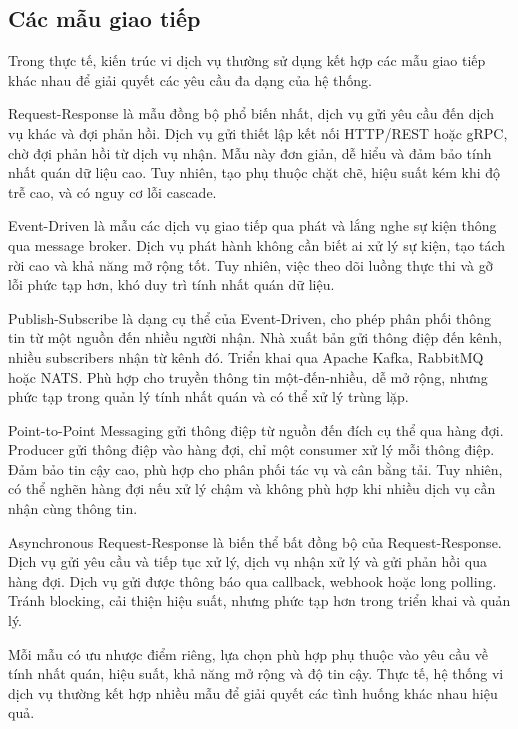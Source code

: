 \subsection{Các mẫu giao tiếp}
Trong thực tế, kiến trúc vi dịch vụ thường sử dụng kết hợp các mẫu giao tiếp khác nhau để giải quyết các yêu cầu đa dạng của hệ thống.

Request-Response là mẫu đồng bộ phổ biến nhất, dịch vụ gửi yêu cầu đến dịch vụ khác và đợi phản hồi. Dịch vụ gửi thiết lập kết nối HTTP/REST hoặc gRPC, chờ đợi phản hồi từ dịch vụ nhận. Mẫu này đơn giản, dễ hiểu và đảm bảo tính nhất quán dữ liệu cao. Tuy nhiên, tạo phụ thuộc chặt chẽ, hiệu suất kém khi độ trễ cao, và có nguy cơ lỗi cascade.

Event-Driven là mẫu các dịch vụ giao tiếp qua phát và lắng nghe sự kiện thông qua message broker. Dịch vụ phát hành không cần biết ai xử lý sự kiện, tạo tách rời cao và khả năng mở rộng tốt. Tuy nhiên, việc theo dõi luồng thực thi và gỡ lỗi phức tạp hơn, khó duy trì tính nhất quán dữ liệu.

Publish-Subscribe là dạng cụ thể của Event-Driven, cho phép phân phối thông tin từ một nguồn đến nhiều người nhận. Nhà xuất bản gửi thông điệp đến kênh, nhiều subscribers nhận từ kênh đó. Triển khai qua Apache Kafka, RabbitMQ hoặc NATS. Phù hợp cho truyền thông tin một-đến-nhiều, dễ mở rộng, nhưng phức tạp trong quản lý tính nhất quán và có thể xử lý trùng lặp.

Point-to-Point Messaging gửi thông điệp từ nguồn đến đích cụ thể qua hàng đợi. Producer gửi thông điệp vào hàng đợi, chỉ một consumer xử lý mỗi thông điệp. Đảm bảo tin cậy cao, phù hợp cho phân phối tác vụ và cân bằng tải. Tuy nhiên, có thể nghẽn hàng đợi nếu xử lý chậm và không phù hợp khi nhiều dịch vụ cần nhận cùng thông tin.

Asynchronous Request-Response là biến thể bất đồng bộ của Request-Response. Dịch vụ gửi yêu cầu và tiếp tục xử lý, dịch vụ nhận xử lý và gửi phản hồi qua hàng đợi. Dịch vụ gửi được thông báo qua callback, webhook hoặc long polling. Tránh blocking, cải thiện hiệu suất, nhưng phức tạp hơn trong triển khai và quản lý.

Mỗi mẫu có ưu nhược điểm riêng, lựa chọn phù hợp phụ thuộc vào yêu cầu về tính nhất quán, hiệu suất, khả năng mở rộng và độ tin cậy. Thực tế, hệ thống vi dịch vụ thường kết hợp nhiều mẫu để giải quyết các tình huống khác nhau hiệu quả.